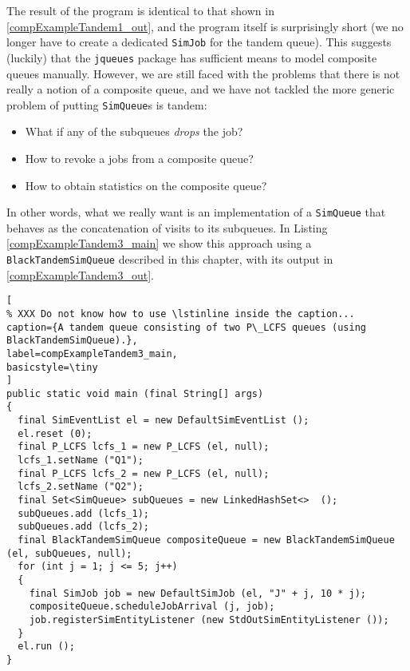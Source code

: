 \documentclass[12pt]{book}
\begin{document}
The result of the program is identical to that shown in \ref{compExampleTandem1_out},
  and the program itself is surprisingly short
  (we no longer have to create a dedicated \lstinline|SimJob| for the tandem queue).
This suggests (luckily) that the \lstinline|jqueues| package has sufficient means to
  model composite queues manually.
However, we are still faced with the problems that there is not really a notion
  of a composite queue, and we have not tackled the more generic problem of
  putting \lstinline|SimQueue|s is tandem:
\begin{itemize}
\item What if any of the subqueues {\em drops} the job?
\item How to revoke a jobs from a composite queue?
\item How to obtain statistics on the composite queue?
\end{itemize}
In other words,
  what we really want is an implementation of a \lstinline|SimQueue|
  that behaves as the concatenation of visits to its subqueues.
In Listing \ref{compExampleTandem3_main} we show this
  approach using a \lstinline|BlackTandemSimQueue|
  described in this chapter,
  with its output in \ref{compExampleTandem3_out}.

\begin{lstlisting}[
% XXX Do not know how to use \lstinline inside the caption...
caption={A tandem queue consisting of two P\_LCFS queues (using BlackTandemSimQueue).},
label=compExampleTandem3_main,
basicstyle=\tiny
]
public static void main (final String[] args)
{    
  final SimEventList el = new DefaultSimEventList ();
  el.reset (0);
  final P_LCFS lcfs_1 = new P_LCFS (el, null);
  lcfs_1.setName ("Q1");
  final P_LCFS lcfs_2 = new P_LCFS (el, null);
  lcfs_2.setName ("Q2");
  final Set<SimQueue> subQueues = new LinkedHashSet<>  ();
  subQueues.add (lcfs_1);
  subQueues.add (lcfs_2);
  final BlackTandemSimQueue compositeQueue = new BlackTandemSimQueue (el, subQueues, null);
  for (int j = 1; j <= 5; j++)
  {
    final SimJob job = new DefaultSimJob (el, "J" + j, 10 * j);
    compositeQueue.scheduleJobArrival (j, job);
    job.registerSimEntityListener (new StdOutSimEntityListener ());
  }
  el.run ();
}
\end{lstlisting}
\end{document}
